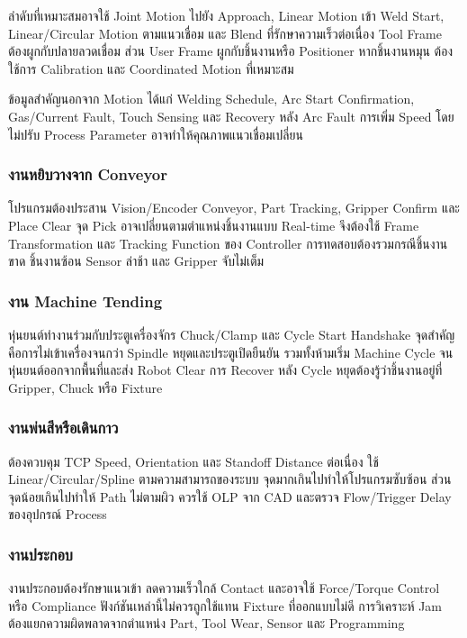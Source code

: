 ลำดับที่เหมาะสมอาจใช้ Joint Motion ไปยัง Approach, Linear Motion เข้า Weld Start, Linear/Circular Motion ตามแนวเชื่อม และ Blend ที่รักษาความเร็วต่อเนื่อง Tool Frame ต้องผูกกับปลายลวดเชื่อม ส่วน User Frame ผูกกับชิ้นงานหรือ Positioner หากชิ้นงานหมุน ต้องใช้การ Calibration และ Coordinated Motion ที่เหมาะสม

ข้อมูลสำคัญนอกจาก Motion ได้แก่ Welding Schedule, Arc Start Confirmation, Gas/Current Fault, Touch Sensing และ Recovery หลัง Arc Fault การเพิ่ม Speed โดยไม่ปรับ Process Parameter อาจทำให้คุณภาพแนวเชื่อมเปลี่ยน

\subsubsection{งานหยิบวางจาก Conveyor}

โปรแกรมต้องประสาน Vision/Encoder Conveyor, Part Tracking, Gripper Confirm และ Place Clear จุด Pick อาจเปลี่ยนตามตำแหน่งชิ้นงานแบบ Real-time จึงต้องใช้ Frame Transformation และ Tracking Function ของ Controller การทดสอบต้องรวมกรณีชิ้นงานขาด ชิ้นงานซ้อน Sensor ล่าช้า และ Gripper จับไม่เต็ม

\subsubsection{งาน Machine Tending}

หุ่นยนต์ทำงานร่วมกับประตูเครื่องจักร Chuck/Clamp และ Cycle Start Handshake จุดสำคัญคือการไม่เข้าเครื่องจนกว่า Spindle หยุดและประตูเปิดยืนยัน รวมทั้งห้ามเริ่ม Machine Cycle จนหุ่นยนต์ออกจากพื้นที่และส่ง Robot Clear การ Recover หลัง Cycle หยุดต้องรู้ว่าชิ้นงานอยู่ที่ Gripper, Chuck หรือ Fixture

\subsubsection{งานพ่นสีหรือเดินกาว}

ต้องควบคุม TCP Speed, Orientation และ Standoff Distance ต่อเนื่อง ใช้ Linear/Circular/Spline ตามความสามารถของระบบ จุดมากเกินไปทำให้โปรแกรมซับซ้อน ส่วนจุดน้อยเกินไปทำให้ Path ไม่ตามผิว ควรใช้ OLP จาก CAD และตรวจ Flow/Trigger Delay ของอุปกรณ์ Process

\subsubsection{งานประกอบ}

งานประกอบต้องรักษาแนวเข้า ลดความเร็วใกล้ Contact และอาจใช้ Force/Torque Control หรือ Compliance ฟังก์ชันเหล่านี้ไม่ควรถูกใช้แทน Fixture ที่ออกแบบไม่ดี การวิเคราะห์ Jam ต้องแยกความผิดพลาดจากตำแหน่ง Part, Tool Wear, Sensor และ Programming

